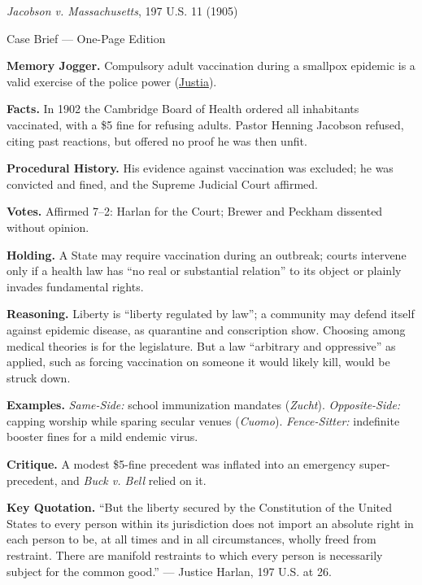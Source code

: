 \documentclass[12pt]{article}
\begin{document}
\begin{center}
{\Large \textit{Jacobson v. Massachusetts}, 197 U.S. 11 (1905)\par}
\vspace{0.3em}
{\normalsize Case Brief --- One-Page Edition\par}
\end{center}

\textbf{Memory Jogger.} Compulsory adult vaccination during a smallpox epidemic is a valid exercise of the police power (\href{https://supreme.justia.com/cases/federal/us/197/11/}{Justia}).

\textbf{Facts.} In 1902 the Cambridge Board of Health ordered all inhabitants vaccinated, with a \$5 fine for refusing adults. Pastor Henning Jacobson refused, citing past reactions, but offered no proof he was then unfit.

\textbf{Procedural History.} His evidence against vaccination was excluded; he was convicted and fined, and the Supreme Judicial Court affirmed.

\textbf{Votes.} Affirmed 7--2: Harlan for the Court; Brewer and Peckham dissented without opinion.

\textbf{Holding.} A State may require vaccination during an outbreak; courts intervene only if a health law has ``no real or substantial relation'' to its object or plainly invades fundamental rights.

\textbf{Reasoning.} Liberty is ``liberty regulated by law''; a community may defend itself against epidemic disease, as quarantine and conscription show. Choosing among medical theories is for the legislature. But a law ``arbitrary and oppressive'' as applied, such as forcing vaccination on someone it would likely kill, would be struck down.

\textbf{Examples.} \emph{Same-Side:} school immunization mandates (\textit{Zucht}). \emph{Opposite-Side:} capping worship while sparing secular venues (\textit{Cuomo}). \emph{Fence-Sitter:} indefinite booster fines for a mild endemic virus.

\textbf{Critique.} A modest \$5-fine precedent was inflated into an emergency super-precedent, and \textit{Buck v. Bell} relied on it.

\textbf{Key Quotation.} ``But the liberty secured by the Constitution of the United States to every person within its jurisdiction does not import an absolute right in each person to be, at all times and in all circumstances, wholly freed from restraint. There are manifold restraints to which every person is necessarily subject for the common good.'' --- Justice Harlan, 197 U.S. at 26.
\end{document}
